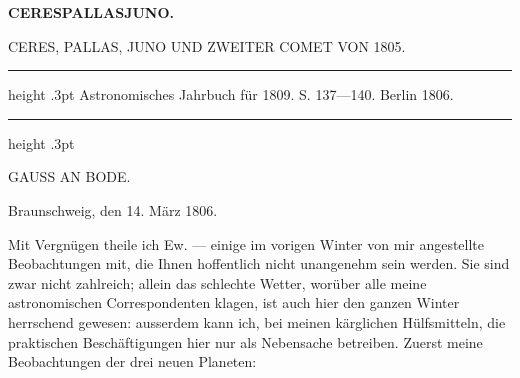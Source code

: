 \clearpage
\endgroup
\begingroup
\pagestyle{empty}
\newcommand{\GaussVICitation}[2]{%
  \begin{center}
  \parbox{#1\linewidth}{%
    \centering\footnotesize\frenchspacing
    \hrule height .3pt\relax\vspace{2.5pt}
    #2\par
    \vspace{2.5pt}\hrule height .3pt\relax
  }%
  \end{center}
  \par\nobreak\medskip
}
\newcommand{\GaussVIGathering}[2]{%
  \fancypagestyle{gaussVIGathering}{%
    \fancyhf{}%
    \renewcommand{\headrulewidth}{0pt}%
    \renewcommand{\footrulewidth}{0pt}%
    \fancyfoot[C]{\makebox[\textwidth][l]{%
      \hspace*{.025\textwidth}{\footnotesize\bfseries #1}\hfill
      {\normalsize\bfseries\textls[90]{#2}}\hspace*{.18\textwidth}}}%
  }%
  \thispagestyle{gaussVIGathering}%
}
\thispagestyle{empty}
\noindent{}%
\makebox[12mm][l]{}%
\parbox[t]{\dimexpr\linewidth-24mm\relax}{\centering\footnotesize\bfseries CERES\enspace PALLAS\enspace JUNO.\par}%
\par\nobreak\medskip
\begin{center}
CERES, PALLAS, JUNO UND ZWEITER COMET VON 1805.
\end{center}
\GaussVICitation{.72}{Astronomisches Jahrbuch für 1809. S. 137—140. Berlin 1806.}

\begin{center}
GAUSS AN BODE.
\end{center}
\begin{flushright}
Braunschweig, den 14. März 1806.
\end{flushright}

\par\indent Mit Vergnügen theile ich Ew. --- einige im vorigen Winter von mir angestellte Beobachtungen mit, die Ihnen hoffentlich nicht unangenehm sein werden. Sie sind zwar nicht zahlreich; allein das schlechte Wetter, worüber alle meine astronomischen Correspondenten klagen, ist auch hier den ganzen Winter herrschend gewesen: ausserdem kann ich, bei meinen kärglichen Hülfsmitteln, die praktischen Beschäftigungen hier nur als Nebensache betreiben. Zuerst meine Beobachtungen der drei neuen Planeten:

